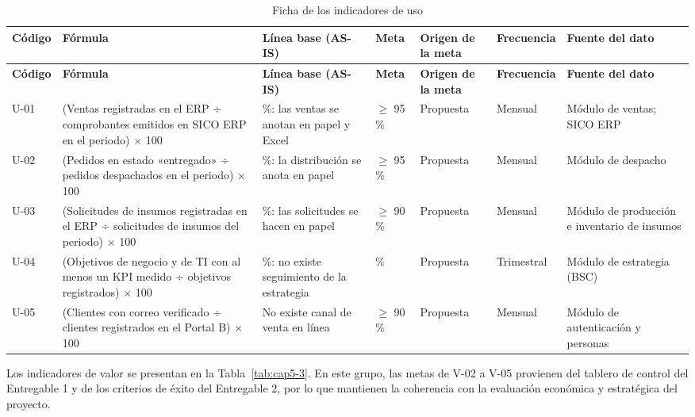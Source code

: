 {\small
\renewcommand{\arraystretch}{1.3}
\begin{longtable}{|>{\raggedright\arraybackslash}p{0.46cm}|>{\raggedright\arraybackslash}p{4.58cm}|>{\raggedright\arraybackslash}p{3.28cm}|>{\raggedright\arraybackslash}p{0.46cm}|>{\raggedright\arraybackslash}p{1.30cm}|>{\raggedright\arraybackslash}p{0.76cm}|>{\raggedright\arraybackslash}p{3.36cm}|}
\caption{Ficha de los indicadores de uso}\label{tab:cap5-2}\\
\hline
\textbf{Código} & \textbf{Fórmula} & \textbf{Línea base (AS-IS)} & \textbf{Meta} & \textbf{Origen de la meta} & \textbf{Frecuencia} & \textbf{Fuente del dato} \\
\hline
\endfirsthead
\hline
\textbf{Código} & \textbf{Fórmula} & \textbf{Línea base (AS-IS)} & \textbf{Meta} & \textbf{Origen de la meta} & \textbf{Frecuencia} & \textbf{Fuente del dato} \\
\hline
\endhead
U-01 & (Ventas registradas en el ERP ÷ comprobantes emitidos en SICO ERP en el periodo) $\times$ 100 & 0 \%: las ventas se anotan en papel y Excel & $\geq$ 95 \% & Propuesta & Mensual & Módulo de ventas; SICO ERP \\
\hline
U-02 & (Pedidos en estado «entregado» ÷ pedidos despachados en el periodo) $\times$ 100 & 0 \%: la distribución se anota en papel & $\geq$ 95 \% & Propuesta & Mensual & Módulo de despacho \\
\hline
U-03 & (Solicitudes de insumos registradas en el ERP ÷ solicitudes de insumos del periodo) $\times$ 100 & 0 \%: las solicitudes se hacen en papel & $\geq$ 90 \% & Propuesta & Mensual & Módulo de producción e inventario de insumos \\
\hline
U-04 & (Objetivos de negocio y de TI con al menos un KPI medido ÷ objetivos registrados) $\times$ 100 & 0 \%: no existe seguimiento de la estrategia & 100 \% & Propuesta & Trimestral & Módulo de estrategia (BSC) \\
\hline
U-05 & (Clientes con correo verificado ÷ clientes registrados en el Portal B) $\times$ 100 & No existe canal de venta en línea & $\geq$ 90 \% & Propuesta & Mensual & Módulo de autenticación y personas \\
\hline
\end{longtable}
}


Los indicadores de valor se presentan en la Tabla~\ref{tab:cap5-3}. En este grupo, las metas de V-02 a V-05 provienen del tablero de control del Entregable 1 y de los criterios de éxito del Entregable 2, por lo que mantienen la coherencia con la evaluación económica y estratégica del proyecto.


